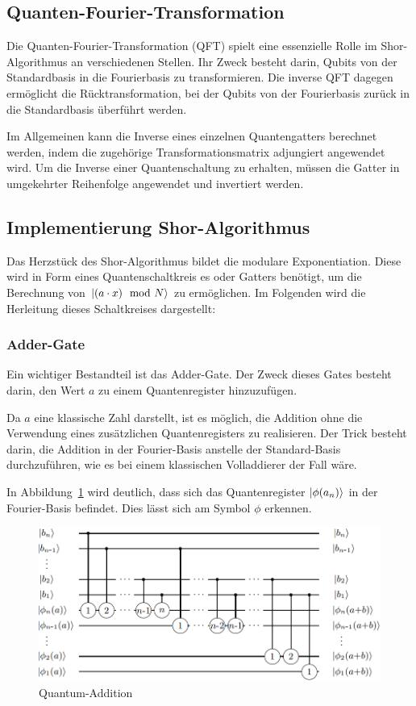 \documentclass[lettersize,journal]{IEEEtran}
\begin{document}
\subsection{Quanten-Fourier-Transformation}
Die Quanten-Fourier-Transformation (QFT) spielt eine essenzielle Rolle im Shor-Algorithmus
an verschiedenen Stellen.
Ihr Zweck besteht darin, Qubits von der Standardbasis in die Fourierbasis zu transformieren.
Die inverse QFT dagegen ermöglicht die Rücktransformation,
bei der Qubits von der Fourierbasis zurück in die Standardbasis überführt werden.

Im Allgemeinen kann die Inverse eines einzelnen Quantengatters berechnet werden,
indem die zugehörige Transformationsmatrix adjungiert angewendet wird.
Um die Inverse einer Quantenschaltung zu erhalten,
müssen die Gatter in umgekehrter Reihenfolge angewendet und invertiert werden.

\subsection{Implementierung Shor-Algorithmus}
Das Herzstück des Shor-Algorithmus bildet die modulare Exponentiation.
Diese wird in Form eines Quantenschaltkreis es oder Gatters benötigt,
um die Berechnung von \(\ket{(a \cdot x)\mod N}\) zu ermöglichen.
Im Folgenden wird die Herleitung dieses Schaltkreises dargestellt:

\subsubsection{Adder-Gate}
Ein wichtiger Bestandteil ist das Adder-Gate.
Der Zweck dieses Gates besteht darin,
den Wert \(a\) zu einem Quantenregister hinzuzufügen.

Da \(a\) eine klassische Zahl darstellt, ist es möglich,
die Addition ohne die Verwendung eines zusätzlichen Quantenregisters zu realisieren.
Der Trick besteht darin, die Addition in der Fourier-Basis anstelle der Standard-Basis durchzuführen,
wie es bei einem klassischen Volladdierer der Fall wäre.

In Abbildung~\ref{fig:Quantum-Addition} wird deutlich,
dass sich das Quantenregister \(\ket{\phi(a_n)}\) in der Fourier-Basis befindet.
Dies lässt sich am Symbol \(\phi\) erkennen.

\begin{figure}[!h]
\caption{Quantum-Addition~\cite{draper2000addition}}
\label{fig:Quantum-Addition}
\includegraphics[width=\linewidth]{Quantum-Addition.PNG}
\centering
\end{figure}
\end{document}

